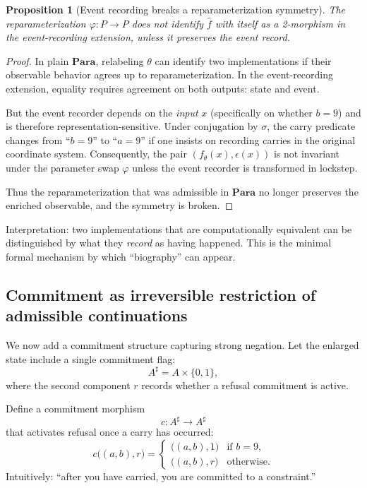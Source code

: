 \documentclass[11pt]{article}
\newtheorem{proposition}{Proposition}
\begin{document}
\begin{proposition}[Event recording breaks a reparameterization symmetry]
The reparameterization $\varphi:P\to P$ does not identify $\widehat f$ with
itself as a 2-morphism in the event-recording extension, unless it preserves the
event record.
\end{proposition}

\begin{proof}
In plain $\mathbf{Para}$, relabeling $\theta$ can identify two implementations if
their observable behavior agrees up to reparameterization.
In the event-recording extension, equality requires agreement on both outputs:
state and event.

But the event recorder depends on the \emph{input} $x$ (specifically on whether
$b=9$) and is therefore representation-sensitive. Under conjugation by
$\sigma$, the carry predicate changes from ``$b=9$'' to ``$a=9$'' if one insists
on recording carries in the original coordinate system. Consequently, the pair
$(f_\theta(x),\epsilon(x))$ is not invariant under the parameter swap
$\varphi$ unless the event recorder is transformed in lockstep.

Thus the reparameterization that was admissible in $\mathbf{Para}$ no longer
preserves the enriched observable, and the symmetry is broken.
\end{proof}

\noindent
Interpretation: two implementations that are computationally equivalent can be
distinguished by what they \emph{record} as having happened. This is the minimal
formal mechanism by which ``biography'' can appear.

\subsection{Commitment as irreversible restriction of admissible continuations}

We now add a commitment structure capturing strong negation. Let the enlarged
state include a single commitment flag:
\[
A^\sharp = A\times \{0,1\},
\]
where the second component $r$ records whether a refusal commitment is active.

Define a commitment morphism
\[
c: A^\sharp \to A^\sharp
\]
that activates refusal once a carry has occurred:
\[
c\bigl((a,b),r\bigr)
=
\begin{cases}
\bigl((a,b),1\bigr) & \text{if } b=9,\\
\bigl((a,b),r\bigr) & \text{otherwise.}
\end{cases}
\]
Intuitively: ``after you have carried, you are committed to a constraint.''
\end{document}
